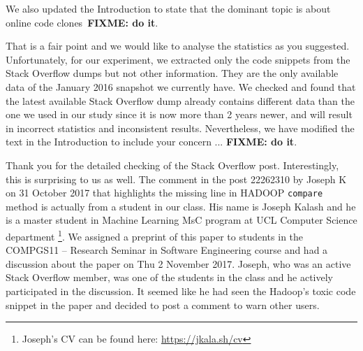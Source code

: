 \documentclass[a4paper,twoside,10pt]{reviewresponse}
\newcommand\FIXME[1]{{\color{red}\textbf{FIXME: #1}}}
\begin{document}
We also updated the Introduction to state that the dominant topic is about online code clones~\FIXME{do it}.


That is a fair point and we would like to analyse the statistics as you suggested. Unfortunately, for our experiment, we extracted only the code snippets from the Stack Overflow dumps but not other information. They are the only available data of the January 2016 snapshot we currently have. We checked and found that the latest available Stack Overflow dump already contains different data than the one we used in our study since it is now more than 2 years newer, and will result in incorrect statistics and inconsistent results. Nevertheless, we have modified the text in the Introduction to include your concern ... \FIXME{do it}.


Thank you for the detailed checking of the Stack Overflow post. Interestingly, this is surprising to us as well. The comment in the post 22262310 by Joseph K on 31 October 2017 that highlights the missing line in HADOOP \texttt{compare} method is actually from a student in our class. His name is Joseph Kalash and he is a master student in Machine Learning MsC program at UCL Computer Science department \footnote{Joseph's CV can be found here: \url{https://jkala.sh/cv}}. We assigned a preprint of this paper to students in the COMPGS11 -- Research Seminar in Software Engineering course and had a discussion about the paper on Thu 2 November 2017. Joseph, who was an active Stack Overflow member, was one of the students in the class and he actively participated in the discussion. It seemed like he had seen the Hadoop's toxic code snippet in the paper and decided to post a comment to warn other users.
\end{document}
